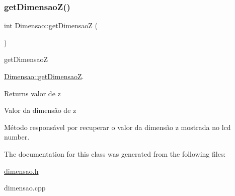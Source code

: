 \subsubsection{\texorpdfstring{getDimensaoZ()}{getDimensaoZ()}}
{\footnotesize\ttfamily int Dimensao\+::get\+DimensaoZ (\begin{DoxyParamCaption}{ }\end{DoxyParamCaption})}



get\+DimensaoZ 

\mbox{\hyperlink{classDimensao_a6a548c7d1634f8b593241c68c74b83c7}{Dimensao\+::get\+DimensaoZ}}.

\begin{DoxyReturn}{Returns}
valor de z

Valor da dimensão de z
\end{DoxyReturn}
Método responsável por recuperar o valor da dimensão z mostrada no lcd number. 

The documentation for this class was generated from the following files\+:\begin{DoxyCompactItemize}
\item 
\mbox{\hyperlink{dimensao_8h}{dimensao.\+h}}\item 
dimensao.\+cpp\end{DoxyCompactItemize}
